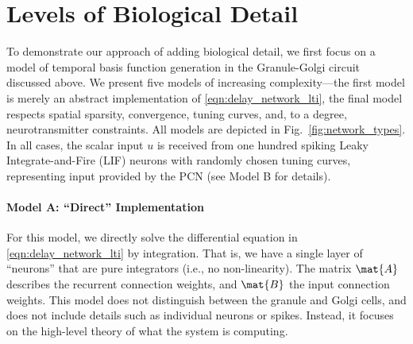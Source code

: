 
\section{Levels of Biological Detail}

To demonstrate our approach of adding biological detail, we first focus on a model of temporal basis function generation in the Granule-Golgi circuit discussed above.
We present five models of increasing complexity---the first model is merely an abstract implementation of \cref{eqn:delay_network_lti}, the final model respects spatial sparsity, convergence, tuning curves, and, to a degree, neurotransmitter constraints.
All models are depicted in Fig.~\ref{fig:network_types}.
In all cases, the scalar input $u$ is received from one hundred spiking Leaky Integrate-and-Fire (LIF) neurons with randomly chosen tuning curves, representing input provided by the PCN (see Model B for details).

\paragraph{Model A: \enquote{Direct} Implementation} 
For this model, we directly solve the differential equation in \cref{eqn:delay_network_lti} by integration.
That is, we have a single layer of \enquote{neurons} that are pure integrators (i.e., no non-linearity). The matrix $\mat{A}$ describes the recurrent connection weights, and $\mat{B}$ the input connection weights.
This model does not distinguish between the granule and Golgi cells, and does not include details such as individual neurons or spikes.
Instead, it focuses on the high-level theory of what the system is computing.


